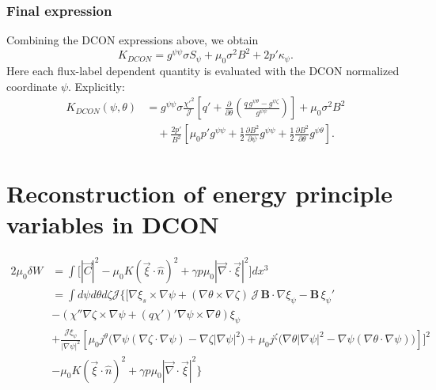 \documentclass[10pt,a4paper]{article}
\numberwithin{equation}{section}
\begin{document}
\subsubsection{Final expression}

\color{black}
Combining the DCON expressions above, we obtain
\begin{equation}
\boxed{
K_{DCON}
=
g^{\psi\psi}\sigma S_{\psi}
+\mu_0\sigma^2B^2
+2p'\kappa_\psi.
}
\end{equation}
Here each flux-label dependent quantity is evaluated with the DCON normalized coordinate
$\psi$.  Explicitly:
\begin{align}
K_{DCON}(\psi,\theta)
&=
g^{\psi\psi}\sigma
\frac{\chi'^2}{\mathcal J}
\left[
q'
+
\frac{\partial}{\partial\theta}
\left(
\frac{q\,g^{\psi\theta}-g^{\psi\zeta}}{g^{\psi\psi}}
\right)
\right]
+\mu_0\sigma^2B^2
\\
&\quad
+\frac{2p'}{B^2}
\left[
\mu_0 p' g^{\psi\psi}
+
\frac{1}{2}\frac{\partial B^2}{\partial\psi}g^{\psi\psi}
+
\frac{1}{2}\frac{\partial B^2}{\partial\theta}g^{\psi\theta}
\right].
\end{align}

\section{Reconstruction of energy principle variables in DCON}

\begin{equation}
\begin{aligned}
2\mu_0\delta W 
&= \int \big[|\vec{C}|^2- \mu_0K(\vec{\xi} \cdot \hat{n})^2 +\gamma p \mu_0|\vec{\nabla} \cdot \vec{\xi}|^2 \big] dx^3\\
&= \int d\psi d\theta d\zeta \mathcal{J} \Big\{ [  \nabla \xi_s \times \nabla \psi
+ (\nabla \theta \times \nabla \zeta)\,\mathcal{J}\,\mathbf{B}\cdot\nabla \xi_\psi
- \mathbf{B}\,\xi_\psi' \\
&-
\left(
    \chi'' \nabla \zeta \times \nabla \psi
    + (q\chi')' \nabla \psi \times \nabla \theta
\right)\xi_\psi \\
&+\frac{\mathcal J\xi_\psi}{|\nabla \psi|^2} [
\mu_0j^\theta
\big(
\nabla\psi(\nabla\zeta\cdot\nabla\psi)
-
\nabla\zeta|\nabla\psi|^2
\big)+\mu_0j^\zeta
\big(
\nabla\theta|\nabla\psi|^2
-
\nabla\psi(\nabla\theta\cdot\nabla\psi)
\big)]]^2 \\
&-\mu_0 K(\vec{\xi} \cdot \hat{n})^2 +\gamma p \mu_0|\vec{\nabla} \cdot \vec{\xi}|^2\}
\end{aligned}
\end{equation}
\end{document}
